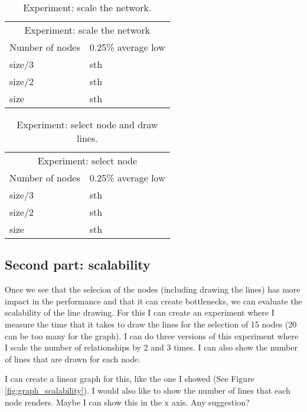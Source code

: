 \begin{table}[h!]
\centering
\begin{tabular}{ll}
\multicolumn{2}{c}{Experiment: scale the network} \\
Number of nodes   & 0.25\% average low \\
size/3 & sth \\
size/2 & sth \\
size & sth \\
\end{tabular}
\caption{Experiment: scale the network.}
\label{tab:experiment_scale}
\end{table}

\begin{table}[h!]
\centering
\begin{tabular}{ll}
\multicolumn{2}{c}{Experiment: select node} \\
Number of nodes   & 0.25\% average low \\
size/3 & sth \\
size/2 & sth \\
size & sth \\
\end{tabular}
\caption{Experiment: select node and draw lines.}
\label{tab:experiment_select}
\end{table}

\subsection{Second part: scalability}

Once we see that the selecion of the nodes (including drawing the lines) has more impact in the performance and that it can create bottlenecks, we can evaluate the scalability of the line drawing. For this I can create an experiment where I measure the time that it takes to draw the lines for the selection of 15 nodes (20 can be too many for the graph). I can do three versions of this experiment where I scale the number of relationships by 2 and 3 times. I can also show the number of lines that are drawn for each node.

I can create a linear graph for this, like the one I showed (See Figure \ref{fig:graph_scalability}). I would also like to show the number of lines that each node renders. Maybe I can show this in the x axis. Any suggestion?

